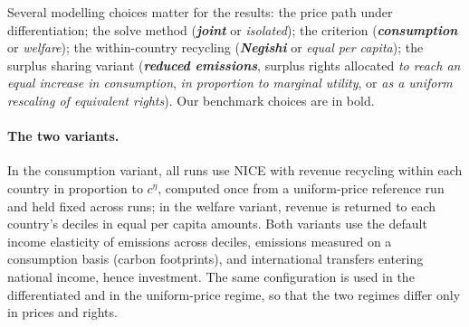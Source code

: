 \documentclass[12pt,english]{article}
\theoremstyle{remark}
\begin{document}
Several modelling choices matter for the results: the price path under differentiation; the solve method (\textbf{\textit{joint}} or \textit{isolated}); the criterion (\textbf{\textit{consumption}} or \textit{welfare}); the within-country recycling (\textbf{\textit{Negishi}} or \textit{equal per capita}); the surplus sharing variant (\textbf{\textit{reduced emissions}}, surplus rights allocated \textit{to reach an equal increase in consumption}, \textit{in proportion to marginal utility}, or \textit{as a uniform rescaling of equivalent rights}). Our benchmark choices are in bold. %

\paragraph{The two variants.} In the consumption variant, all runs use NICE with revenue recycling within each country in proportion to $c^{\eta}$, computed once from a uniform-price reference run and held fixed across runs; in the welfare variant, revenue is returned to each country's deciles in equal per capita amounts. %
Both variants use the default income elasticity of emissions across deciles, emissions measured on a consumption basis (carbon footprints), and international transfers entering national income, hence investment. The same configuration is used in the differentiated and in the uniform-price regime, so that the two regimes differ only in prices and rights.
\end{document}
